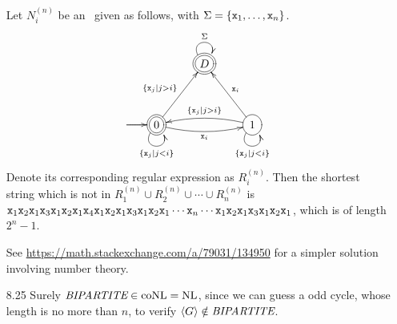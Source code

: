 \begin{itemize}
	\item[\Star 8.24]
		Let $N_i^{(n)}$ be an \NFA\ given as follows, with $\Sigma = \{\texttt{x}_1, \dots, \texttt{x}_n\}$.
		$$
			\xymatrix@R=3pc@C=2pc{
				& *+<1pc>[o][F=]{D} \ar@(lu,ru)[]^{\Sigma} & \\
				*+<1pc>[o][F=]{0} \ar@(l,l)[]^{} \ar@(ld,rd)[]_{\{ \TT{x}_j | j < i \}} \ar@/_/[rr]_{\TT{x}_i} \ar[ru]^{\{ \TT{x}_j | j > i \}} && 
				*+<1pc>[o][F-]{1} \ar@(ld,rd)[]_{\{ \TT{x}_j | j < i \}} \ar[lu]_{\TT{x}_i} \ar@/_/[ll]_{\{ \TT{x}_j | j > i \}}			
			}
		$$
		Denote its corresponding regular expression as $R_i^{(n)}$. Then the shortest string which is not in $R_1^{(n)} \cup R_2^{(n)} \cup \cdots \cup R_n^{(n)}$ is $\texttt{x}_1 \texttt{x}_2 \texttt{x}_1 \texttt{x}_3 \texttt{x}_1 \texttt{x}_2 \texttt{x}_1 \texttt{x}_4 \texttt{x}_1 \texttt{x}_2 \texttt{x}_1 \texttt{x}_3 \texttt{x}_1 \texttt{x}_2 \texttt{x}_1 \cdots \texttt{x}_n \cdots \texttt{x}_1 \texttt{x}_2 \texttt{x}_1 \texttt{x}_3 \texttt{x}_1 \texttt{x}_2 \texttt{x}_1$, which is of length $2^{n}-1$.
		
		See \url{https://math.stackexchange.com/a/79031/134950} for a simpler solution involving number theory.
	
	\item[8.25]
	Surely $\textit{BIPARTITE} \in \textrm{coNL} = \textrm{NL}$, since we can guess a odd cycle, whose length is no more than $n$, to verify $\langle {G} \rangle \notin \textit{BIPARTITE}$.
	

\end{itemize}
